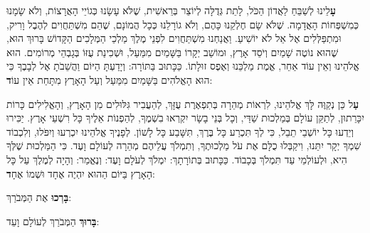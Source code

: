

\divider


\textbf{עָ}לֵינוּ לְשַׁבֵּחַ לַאֲדוֹן הַכֹּל, לָתֵת גְּדֻלָּה לְיוֹצֵר בְּרֵאשִׁית, שֶׁלֹּא עָשָׂנוּ כְּגוֹיֵי הָאֲרָצוֹת, וְלֹא שָׂמָנוּ כְּמִשְׁפְּחוֹת הָאֲדָמָה. שֶׁלֹּא שָׂם חֶלְקֵנוּ כָּהֶם, וְלֹא גוֹרָלֵנוּ כְּכָל הֲמוֹנָם, שֶׁהֵם מִשְׁתַּחֲוִים לְהֶבֶל וָרִיק, וּמִתְפַּלְּלִים אֶל אֵל לֹא יוֹשִׁיעַ. וַאֲנַחְנוּ מִשְׁתַּחֲוִים לִפְנֵי מֶלֶךְ מַלְכֵי הַמְּלָכִים הַקָּדוֹשׁ בָּרוּךְ הוּא, שֶׁהוּא נוֹטֶה שָׁמַיִם וְיֹסֵד אָרֶץ, וּמוֹשַׁב יְקָרוֹ בַּשָּׁמַיִם מִמַּעַל, וּשְׁכִינַת עֻזּוֹ בְּגָבְהֵי מְרוֹמִים. הוּא אֱלֹהֵינוּ וְאֵין עוֹד אַחֵר, אֱמֶת מַלְכֵּנוּ וְאֶפֶס זוּלָתוֹ. כַּכָּתוּב בַּתּוֹרָה: וְיָדַעְתָּ הַיּוֹם וַהֲשֵׁבֹתָ אֶל לְבָבֶךָ כִּי \Shem{} הוּא הָאֱלֹהִים בַּשָּׁמַיִם מִמַּעַל וְעַל הָאָרֶץ מִתָּחַת אֵין עוֹ\textbf{ד}:

\textbf{עַ}ל כֵּן נְקַוֶּה לָּךְ \Shem{} אֱלֹהֵינוּ, לִרְאוֹת מְהֵרָה בְּתִפְאֶרֶת עֻזָּךְ, לְהַעֲבִיר גִּלּוּלִים מִן הָאָרֶץ, וְהָאֱלִילִים כָּרוֹת יִכָּרֵתוּן, לְתַקֵּן עוֹלָם בְּמַלְכוּת שַׁדַּי, וְכָל בְּנֵי בָשָׂר יִקְרְאוּ בִשְׁמֶךָ, לְהַפְנוֹת אֵלֶיךָ כָּל רִשְׁעֵי אָרֶץ. יַכִּירוּ וְיֵדְעוּ כָּל יוֹשְׁבֵי תֵבֵל, כִּי לְךָ תִּכְרַע כָּל בֶּרֶךְ, תִּשָּׁבַע כָּל לָשׁוֹן. לְפָנֶיךָ \Shem{} אֱלֹהֵינוּ יִכְרְעוּ וְיִפֹּלוּ, וְלִכְבוֹד שִׁמְךָ יְקָר יִתֵּנוּ, וִיקַבְּלוּ כֻלָּם אֶת עֹל מַלְכוּתֶךָ, וְתִמְלֹךְ עֲלֵיהֶם מְהֵרָה לְעוֹלָם וָעֶד. כִּי הַמַּלְכוּת שֶׁלְּךָ הִיא, וּלְעוֹלְמֵי עַד תִּמְלֹךְ בְּכָבוֹד. כַּכָּתוּב בְּתוֹרָתָךְ: \Shem{} יִמְלֹךְ לְעֹלָם וָעֶד: וְנֶאֱמַר: וְהָיָה \Shem{} לְמֶלֶךְ עַל כָּל הָאָרֶץ בַּיּוֹם הַהוּא יִהְיֶה \Shem{} אֶחָד וּשְׁמוֹ אֶחָ\textbf{ד}:

\textbf{בָּרְכוּ} אֶת \Shem{} הַמְּבֹרַךְ:

\textbf{בָּרוּךְ} \Shem{} הַמְּבֹרַךְ לְעוֹלָם וָעֵד:


